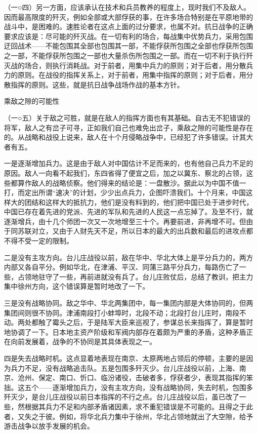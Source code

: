 \documentclass[UTF8, 12pt, a4paper]{ctexrep}
\begin{document}
（一○四）另一方面，应该承认在技术和兵员教养的程度上，现时我们不及敌人。因而最高限度的歼灭，例如全部或大部俘获的事，在许多场合特别是在平原地带的战斗中，是困难的。速胜论者在这点上面的过分要求，也属不对。抗日战争的正确要求应该是：尽可能的歼灭战。在一切有利的场合，每战集中优势兵力，采用包围迂回战术——不能包围其全部也包围其一部，不能俘获所包围之全部也俘获所包围之一部，不能俘获所包围之一部也大量杀伤所包围之一部。而在一切不利于执行歼灭战的场合，则执行消耗战。对于前者，用集中兵力的原则；对于后者，用分散兵力的原则。在战役的指挥关系上，对于前者，用集中指挥的原则；对于后者，用分散指挥的原则。这些，就是抗日战争战场作战的基本方针。

乘敌之隙的可能性

（一○五）关于敌之可胜，就是在敌人的指挥方面也有其基础。自古无不犯错误的将军，敌人之有岔子可寻，正如我们自己也难免出岔子，乘敌之隙的可能性是存在的。从战略和战役上说来，敌人在十个月侵略战争中，已经犯了许多错误。计其大者有五。

一是逐渐增加兵力。这是由于敌人对中国估计不足而来的，也有他自己兵力不足的原因。敌人一向看不起我们，东四省得了便宜之后，加之以冀东、察北的占领，这些都算作敌人的战略侦察。他们得来的结论是：一盘散沙。据此以为中国不值一打，而定出所谓“速决”的计划，少少出点兵力，企图吓溃我们。十个月来，中国这样大的团结和这样大的抵抗力，他们是没有料到的，他们把中国已处于进步时代，中国已存在着先进的党派、先进的军队和先进的人民这一点忘掉了。及至不行，就逐渐增兵，由十几个师团一次又一次地增至三十个。再要前进，非再增不可。但由于同苏联对立，又由于人财先天不足，所以日本的最大的出兵数和最后的进攻点都不得不受一定的限制。

二是没有主攻方向。台儿庄战役以前，敌在华中、华北大体上是平分兵力的，两方内部又各自平分。例如华北，在津浦、平汉、同蒲三路平分兵力，每路伤亡了一些，占领地驻守了一些，再前进就没有兵了。台儿庄败仗后，总结了教训，把主力集中徐州方向，这个错误算是暂时地改了一下。

三是没有战略协同。敌之华中、华北两集团中，每一集团内部是大体协同的，但两集团间则很不协同。津浦南段打小蚌埠时，北段不动；北段打台儿庄时，南段不动。两处都触了霉头之后，于是陆军大臣来巡视了，参谋总长来指挥了，算是暂时地协调了一下。日本地主资产阶级和军阀内部存在着颇为严重的矛盾，这种矛盾正在向前发展着，战争的不协同是其具体表现之一。

四是失去战略时机。这点显着地表现在南京、太原两地占领后的停顿，主要的是因为兵力不足，没有战略追击队。五是包围多歼灭少。台儿庄战役以前，上海、南京、沧州、保定、南口、忻口、临汾诸役，击破者多，俘获者少，表现其指挥的笨拙。这五个——逐渐增加兵力，没有主攻方向，没有战略协同，失去时机，包围多歼灭少，是台儿庄战役以前日本指挥的不行之点。台儿庄战役以后，虽已改了一些，然根据其兵力不足和内部矛盾诸因素，求不重犯错误是不可能的。且得之于此者，又失之于彼。例如，将华北兵力集中于徐州，华北占领地就出了大空隙，给予游击战争以放手发展的机会。
\end{document}
